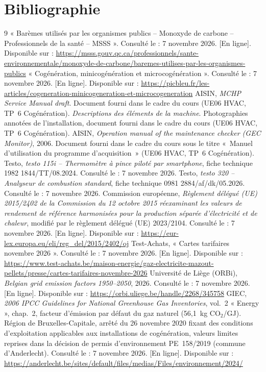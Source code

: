 \section{Bibliographie}
\label{sec:bibliographie}

\begin{thebibliography}{9}
   « Barèmes utilisés par les organismes publics -- Monoxyde de carbone -- Professionnels de la santé -- MSSS ». Consulté le : 7 novembre 2026. [En ligne]. Disponible sur : \url{https://msss.gouv.qc.ca/professionnels/sante-environnementale/monoxyde-de-carbone/baremes-utilises-par-les-organismes-publics}
   « Cogénération, minicogénération et microcogénération ». Consulté le : 7 novembre 2026. [En ligne]. Disponible sur : \url{https://picbleu.fr/les-articles/cogeneration-minicogeneration-et-microcogeneration}
   AISIN, \emph{MCHP Service Manual draft}. Document fourni dans le cadre du cours (UE06 HVAC, TP~6 Cogénération).
   \emph{Descriptions des éléments de la machine}. Photographies annotées de l'installation, document fourni dans le cadre du cours (UE06 HVAC, TP~6 Cogénération).
   AISIN, \emph{Operation manual of the maintenance checker (GEC Monitor)}, 2006. Document fourni dans le cadre du cours sous le titre «~Manuel d'utilisation du programme d'acquisition~» (UE06 HVAC, TP~6 Cogénération).
   Testo, \emph{testo 115i -- Thermomètre à pince piloté par smartphone}, fiche technique 1982 1844/TT/08.2024. Consulté le : 7 novembre 2026.
   Testo, \emph{testo 320 -- Analyseur de combustion standard}, fiche technique 0981 2884/af/dk/05.2026. Consulté le : 7 novembre 2026.
   Commission européenne, \emph{Règlement délégué (UE) 2015/2402 de la Commission du 12 octobre 2015 réexaminant les valeurs de rendement de référence harmonisées pour la production séparée d'électricité et de chaleur}, modifié par le règlement délégué (UE) 2023/2104. Consulté le : 7 novembre 2026. [En ligne]. Disponible sur : \url{https://eur-lex.europa.eu/eli/reg_del/2015/2402/oj}
   Test-Achats, « Cartes tarifaires novembre 2026 ». Consulté le : 7 novembre 2026. [En ligne]. Disponible sur : \url{https://www.test-achats.be/maison-energie/gaz-electricite-mazout-pellets/presse/cartes-tarifaires-novembre-2026}
   Université de Liège (ORBi), \emph{Belgian grid emission factors 1950--2050}, 2026. Consulté le : 7 novembre 2026. [En ligne]. Disponible sur : \url{https://orbi.uliege.be/handle/2268/345758}
   GIEC, \emph{2006 IPCC Guidelines for National Greenhouse Gas Inventories}, vol.~2 « Energy », chap.~2, facteur d'émission par défaut du gaz naturel (56,1~kg CO$_2$/GJ).
   Région de Bruxelles-Capitale, arrêté du 26 novembre 2020 fixant des conditions d'exploitation applicables aux installations de cogénération, valeurs limites reprises dans la décision de permis d'environnement PE~158/2019 (commune d'Anderlecht). Consulté le : 7 novembre 2026. [En ligne]. Disponible sur : \url{https://anderlecht.be/sites/default/files/medias/Files/environnement/2024/}
\end{thebibliography}


